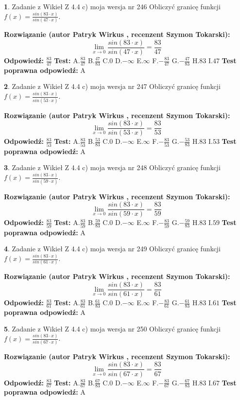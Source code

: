 \documentclass[12pt, a4paper]{article}
\theoremstyle{definition} %
\newtheorem{zad}{}
\newcommand{\zadStart}[1]{\begin{zad}#1\newline}
\newcommand{\zadStop}{\end{zad}}
\newcommand{\rozwStart}[2]{\noindent \textbf{Rozwiązanie (autor #1 , recenzent #2): }\newline}
\newcommand{\rozwStop}{\newline}
\newcommand{\odpStart}{\noindent \textbf{Odpowiedź:}\newline}
\newcommand{\odpStop}{\newline}
\newcommand{\testStart}{\noindent \textbf{Test:}\newline}
\newcommand{\testStop}{\newline}
\newcommand{\kluczStart}{\noindent \textbf{Test poprawna odpowiedź:}\newline}
\newcommand{\kluczStop}{\newline}
\begin{document}
\zadStart{Zadanie z Wikieł Z 4.4 c) moja wersja nr 246}
Obliczyć granicę funkcji $f(x)=\frac{sin(83\cdot x)}{sin(47\cdot x)}$.
\zadStop
\rozwStart{Patryk Wirkus}{Szymon Tokarski}
$$\lim\limits_{x\to 0}\frac{sin(83\cdot x)}{sin(47\cdot x)}=
\frac{83}{47}$$
\rozwStop
\odpStart
$\frac{83}{47}$
\odpStop
\testStart
A.$\frac{83}{47}$
B.$\frac{47}{83}$
C.$0$
D.$-\infty$
E.$\infty$
F.$-\frac{83}{47}$
G.$-\frac{47}{83}$
H.$83$
I.$47$
\testStop
\kluczStart
A
\kluczStop



\zadStart{Zadanie z Wikieł Z 4.4 c) moja wersja nr 247}
Obliczyć granicę funkcji $f(x)=\frac{sin(83\cdot x)}{sin(53\cdot x)}$.
\zadStop
\rozwStart{Patryk Wirkus}{Szymon Tokarski}
$$\lim\limits_{x\to 0}\frac{sin(83\cdot x)}{sin(53\cdot x)}=
\frac{83}{53}$$
\rozwStop
\odpStart
$\frac{83}{53}$
\odpStop
\testStart
A.$\frac{83}{53}$
B.$\frac{53}{83}$
C.$0$
D.$-\infty$
E.$\infty$
F.$-\frac{83}{53}$
G.$-\frac{53}{83}$
H.$83$
I.$53$
\testStop
\kluczStart
A
\kluczStop



\zadStart{Zadanie z Wikieł Z 4.4 c) moja wersja nr 248}
Obliczyć granicę funkcji $f(x)=\frac{sin(83\cdot x)}{sin(59\cdot x)}$.
\zadStop
\rozwStart{Patryk Wirkus}{Szymon Tokarski}
$$\lim\limits_{x\to 0}\frac{sin(83\cdot x)}{sin(59\cdot x)}=
\frac{83}{59}$$
\rozwStop
\odpStart
$\frac{83}{59}$
\odpStop
\testStart
A.$\frac{83}{59}$
B.$\frac{59}{83}$
C.$0$
D.$-\infty$
E.$\infty$
F.$-\frac{83}{59}$
G.$-\frac{59}{83}$
H.$83$
I.$59$
\testStop
\kluczStart
A
\kluczStop



\zadStart{Zadanie z Wikieł Z 4.4 c) moja wersja nr 249}
Obliczyć granicę funkcji $f(x)=\frac{sin(83\cdot x)}{sin(61\cdot x)}$.
\zadStop
\rozwStart{Patryk Wirkus}{Szymon Tokarski}
$$\lim\limits_{x\to 0}\frac{sin(83\cdot x)}{sin(61\cdot x)}=
\frac{83}{61}$$
\rozwStop
\odpStart
$\frac{83}{61}$
\odpStop
\testStart
A.$\frac{83}{61}$
B.$\frac{61}{83}$
C.$0$
D.$-\infty$
E.$\infty$
F.$-\frac{83}{61}$
G.$-\frac{61}{83}$
H.$83$
I.$61$
\testStop
\kluczStart
A
\kluczStop



\zadStart{Zadanie z Wikieł Z 4.4 c) moja wersja nr 250}
Obliczyć granicę funkcji $f(x)=\frac{sin(83\cdot x)}{sin(67\cdot x)}$.
\zadStop
\rozwStart{Patryk Wirkus}{Szymon Tokarski}
$$\lim\limits_{x\to 0}\frac{sin(83\cdot x)}{sin(67\cdot x)}=
\frac{83}{67}$$
\rozwStop
\odpStart
$\frac{83}{67}$
\odpStop
\testStart
A.$\frac{83}{67}$
B.$\frac{67}{83}$
C.$0$
D.$-\infty$
E.$\infty$
F.$-\frac{83}{67}$
G.$-\frac{67}{83}$
H.$83$
I.$67$
\testStop
\kluczStart
A
\kluczStop
\end{document}
